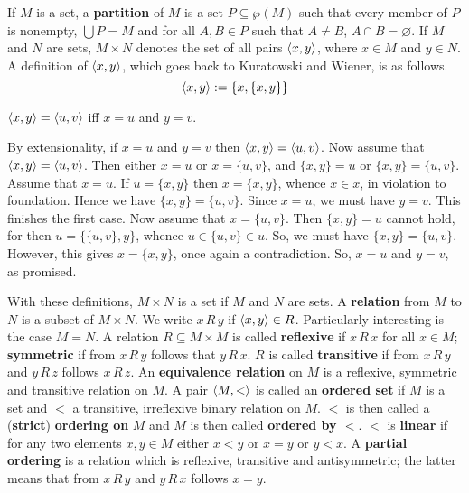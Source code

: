 If $M$ is a set, a \textbf{partition} 
of $M$ is a set $P \subseteq \wp(M)$ such that every member of $P$ 
is nonempty, $\bigcup P = M$ and for all $A, B \in P$ such that 
$A \neq B$, $A \cap B = \varnothing$. 
If $M$ and $N$ are sets, $M \times N$ denotes the set of all
pairs $\langle x, y\rangle$, where $x \in M$ and $y \in N$.
A definition of $\langle x,y\rangle$, which goes back to Kuratowski 
and Wiener, is as follows.
\begin{equation}
\langle x, y\rangle := \{x, \{x,y\}\}
\end{equation}
\begin{lem}
$\langle x, y\rangle = \langle u, v\rangle$ iff $x = u$ and $y = v$.
\end{lem}
\proofbeg
By extensionality, if $x = u$ and $y = v$ then $\langle x, y\rangle =
\langle u, v\rangle$. Now assume that $\langle x, y\rangle = \langle u, v\rangle$.
Then either $x = u$ or $x = \{u, v\}$, and $\{x, y\} = u$ or $\{x,y\} =
\{u,v\}$. Assume that $x = u$. If $u = \{x,y\}$ then $x = \{x, y\}$, 
whence $x \in x$, in violation to foundation. Hence we have 
$\{x,y\} = \{u, v\}$. Since $x = u$, we must have $y = v$. This 
finishes the first case. Now assume that $x = \{u,v\}$. Then 
$\{x,y\} = u$ cannot hold, for then $u = \{\{u,v\},y\}$, whence 
$u \in \{u,v\} \in u$. So, we must have $\{x,y\} = \{u,v\}$. 
However, this gives $x = \{x,y\}$, once again a contradiction.
So, $x = u$ and $y = v$, as promised.
\proofend

With these definitions, $M \times N$ is a set if $M$ and $N$ are
sets. A
\textbf{relation} from $M$ to $N$ is a subset of
$M \times N$. We write $x\, R\, y$ if $\langle x, y\rangle
\in R$. Particularly interesting is the case $M = N$.
A relation $R \subseteq M \times M$ is called
\textbf{reflexive} if $x \, R\, x$ for all $x \in M$;
\textbf{symmetric} if from $x\, R\, y$ follows that
$y \, R\, x$. $R$ is called \textbf{transitive} if from
$x \, R\, y$ and $y \, R\, z$ follows $x \, R \, z$.
An \textbf{equivalence relation} on $M$ is a reflexive,
symmetric and transitive relation on $M$.
A pair $\langle M, <\rangle$ is called an \textbf{ordered set}
if $M$ is a set and $<$ a transitive, irreflexive binary relation
on $M$. $<$ is then called a
(\textbf{strict}) \textbf{ordering on} $M$ and $M$ is then called
\textbf{ordered by $<$}. $<$ is \textbf{linear} if for any two
elements $x, y \in M$ either $x < y$ or $x = y$ or $y < x$.
A \textbf{partial ordering} is a relation which is reflexive,
transitive and antisymmetric; the latter means that
from $x\, R \, y$ and $y\, R\, x$ follows $x = y$.

